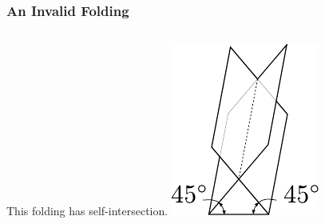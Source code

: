\documentclass{beamer}
\begin{document}
\begin{frame}
\frametitle{An Invalid Folding}
\begin{columns}[c]
This folding has self-intersection.
\includegraphics[width=.6\textwidth]{knot_pix/folded-invalid.pdf}
\end{columns}
\end{frame}
\end{document}
